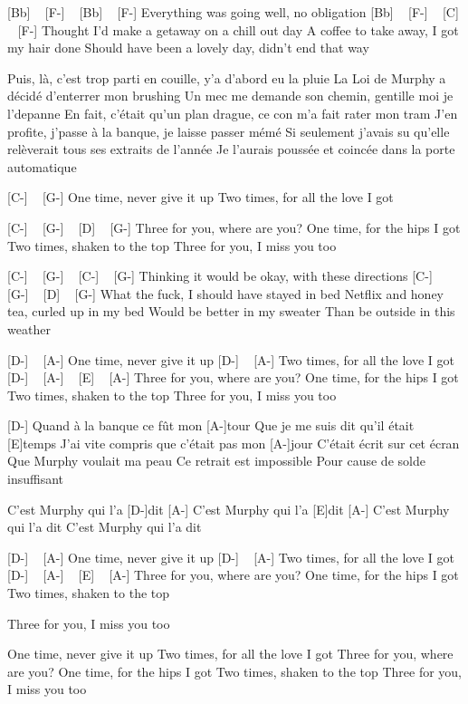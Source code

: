 
[Bb] ~ [F-] ~ [Bb] ~ [F-] 
Everything was going well, no obligation
[Bb] ~ [F-] ~ [C] ~ [F-]
Thought I'd make a getaway on a chill out day
A coffee to take away, I got my hair done
Should have been a lovely day, didn't end that way


Puis, là, c'est trop parti en couille, y'a d'abord eu la pluie
La Loi de Murphy a décidé d'enterrer mon brushing
Un mec me demande son chemin, gentille moi je l'depanne
En fait, c'était qu'un plan drague, ce con m'a fait rater mon tram
J'en profite, j'passe à la banque, je laisse passer mémé
Si seulement j'avais su qu'elle relèverait tous ses extraits de l'année
Je l'aurais poussée et coincée dans la porte automatique

[C-] ~ [G-]
One time, never give it up
Two times, for all the love I got

[C-] ~ [G-] ~ [D] ~ [G-]
Three for you, where are you?
One time, for the hips I got
Two times, shaken to the top
Three for you, I miss you too

[C-] ~ [G-] ~ [C-] ~ [G-]
Thinking it would be okay, with these directions
[C-] ~ [G-] ~ [D] ~ [G-]
What the fuck, I should have stayed in bed
Netflix and honey tea, curled up in my bed
Would be better in my sweater
Than be outside in this weather

[D-] ~ [A-]
One time, never give it up
[D-] ~ [A-]
Two times, for all the love I got
[D-] ~ [A-] ~ [E] ~ [A-]
Three for you, where are you?
One time, for the hips I got
Two times, shaken to the top
Three for you, I miss you too

[D-]
Quand à la banque ce fût mon [A-]tour
Que je me suis dit qu'il était [E]temps
J'ai vite compris que c'était pas mon [A-]jour
C'était écrit sur cet écran
Que Murphy voulait ma peau
Ce retrait est impossible
Pour cause de solde insuffisant

C'est Murphy qui l'a [D-]dit [A-]
C'est Murphy qui l'a [E]dit [A-]
C'est Murphy qui l'a dit
C'est Murphy qui l'a dit


[D-] ~ [A-]
One time, never give it up
[D-] ~ [A-]
Two times, for all the love I got
[D-] ~ [A-] ~ [E] ~ [A-]
Three for you, where are you?
One time, for the hips I got
Two times, shaken to the top

Three for you, I miss you too

One time, never give it up
Two times, for all the love I got
Three for you, where are you?
One time, for the hips I got
Two times, shaken to the top
Three for you, I miss you too

